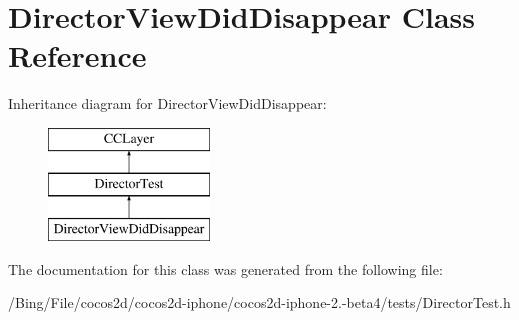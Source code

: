 \hypertarget{interface_director_view_did_disappear}{\section{Director\-View\-Did\-Disappear Class Reference}
\label{interface_director_view_did_disappear}
}
Inheritance diagram for Director\-View\-Did\-Disappear\-:\begin{figure}[H]
\begin{center}
\leavevmode
\includegraphics[height=3.000000cm]{interface_director_view_did_disappear}
\end{center}
\end{figure}


The documentation for this class was generated from the following file\-:\begin{DoxyCompactItemize}
\item 
/\-Bing/\-File/cocos2d/cocos2d-\/iphone/cocos2d-\/iphone-\/2.-\/beta4/tests/Director\-Test.\-h\end{DoxyCompactItemize}
